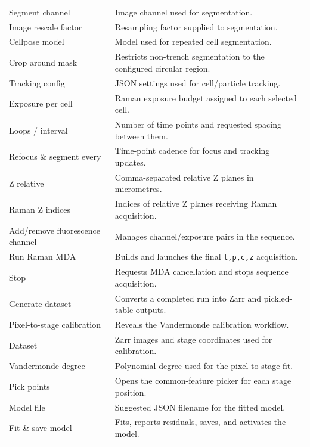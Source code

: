 \documentclass[11pt,oneside]{report}
\newcommand{\code}[1]{\texttt{#1}}
\begin{document}
\begin{longtable}{@{}p{}p{}@{}}
Segment channel & Image channel used for segmentation.\\
Image rescale factor & Resampling factor supplied to segmentation.\\
Cellpose model & Model used for repeated cell segmentation.\\
Crop around mask & Restricts non-trench segmentation to the configured circular region.\\
Tracking config & JSON settings used for cell/particle tracking.\\
Exposure per cell & Raman exposure budget assigned to each selected cell.\\
Loops / interval & Number of time points and requested spacing between them.\\
Refocus \& segment every & Time-point cadence for focus and tracking updates.\\
Z relative & Comma-separated relative Z planes in micrometres.\\
Raman Z indices & Indices of relative Z planes receiving Raman acquisition.\\
Add/remove fluorescence channel & Manages channel/exposure pairs in the sequence.\\
Run Raman MDA & Builds and launches the final \code{t,p,c,z} acquisition.\\
Stop & Requests MDA cancellation and stops sequence acquisition.\\
Generate dataset & Converts a completed run into Zarr and pickled-table outputs.\\
Pixel-to-stage calibration & Reveals the Vandermonde calibration workflow.\\
Dataset & Zarr images and stage coordinates used for calibration.\\
Vandermonde degree & Polynomial degree used for the pixel-to-stage fit.\\
Pick points & Opens the common-feature picker for each stage position.\\
Model file & Suggested JSON filename for the fitted model.\\
Fit \& save model & Fits, reports residuals, saves, and activates the model.\\
\bottomrule\end{longtable}
\end{document}
